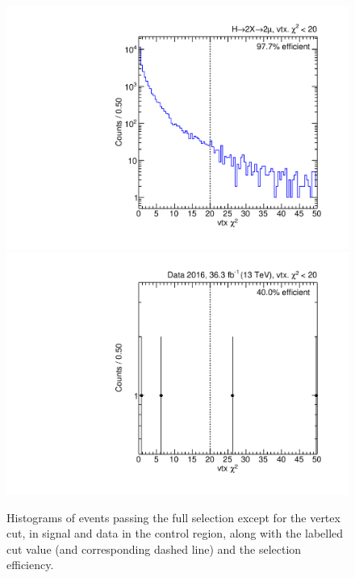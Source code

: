 \begin{figure}[p]
  \centering
  \includegraphics[width=\DSquareWidth]{figures/displaced/NM1_2Mu2J_vtxChi2.pdf}
  \hspace*{-2em}
  \includegraphics[width=\DSquareWidth]{figures/displaced/NM1_Data_vtxChi2.pdf}
  \caption[Histograms of events passing the full selection except for the vertex \chisq cut in \twoMu signal and data.]{Histograms of events passing the full selection except for the vertex \chisq cut, in  \twoMu signal and  data in the control region, along with the labelled cut value (and corresponding dashed line) and the selection efficiency.}
  \label{fig:dd:NM1_vtxChi2}
\end{figure}

